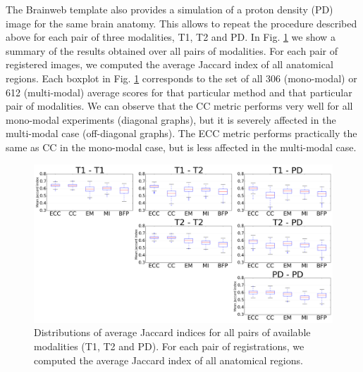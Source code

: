 The Brainweb template also provides a simulation of a proton density (PD) image for the same brain anatomy. This allows to repeat the procedure described above for each pair of three modalities, T1, T2 and PD. In Fig. \ref{fig:all_pairs_boxplots} we show a summary of the results obtained over all pairs of modalities. For each pair of registered images, we computed the average Jaccard index of all anatomical regions. Each boxplot in Fig. \ref{fig:all_pairs_boxplots} corresponds to the set of all 306 (mono-modal) or 612 (multi-modal) average scores for that particular method and that particular pair of modalities. We can observe that the CC metric performs very well for all mono-modal experiments (diagonal graphs), but it is severely affected in the multi-modal case (off-diagonal graphs). The ECC metric performs practically the same as CC in the mono-modal case, but is less affected in the multi-modal case.
%
%



\begin{figure}[t!]
\centering
    \includegraphics[width=\linewidth]{images/all_modality_pairs_boxplots.png}
    \caption{{\small Distributions of average Jaccard indices for all pairs of available modalities (T1, T2 and PD). For each pair of registrations, we computed the average Jaccard index of all anatomical regions.}}
\label{fig:all_pairs_boxplots}\figcloser
\end{figure}

